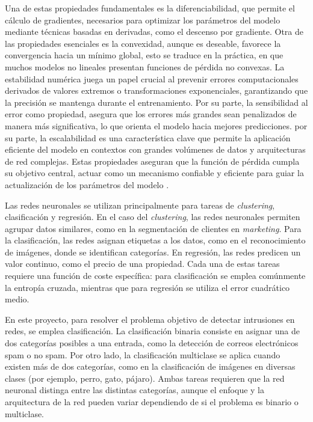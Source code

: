 Una de estas propiedades fundamentales es la diferenciabilidad, que permite el cálculo de gradientes, necesarios para optimizar los parámetros del modelo mediante técnicas basadas en derivadas, como el descenso por gradiente. Otra de las propiedades esenciales es la convexidad, aunque es deseable, favorece la convergencia hacia un mínimo global, esto se traduce en la práctica, en que muchos modelos no lineales presentan funciones de pérdida no convexas. La estabilidad numérica juega un papel crucial al prevenir errores computacionales derivados de valores extremos o transformaciones exponenciales, garantizando que la precisión se mantenga durante el entrenamiento. Por su parte, la sensibilidad al error como propiedad, asegura que los errores más grandes sean penalizados de manera más significativa, lo que orienta el modelo hacia mejores predicciones. por su parte, la escalabilidad es una característica clave que permite la aplicación eficiente del modelo en contextos con grandes volúmenes de datos y arquitecturas de red complejas. Estas propiedades aseguran que la función de pérdida cumpla su objetivo central, actuar como un mecanismo confiable y eficiente para guiar la actualización de los parámetros del modelo \cite{ultralytics_loss_function}.

Las redes neuronales se utilizan principalmente para tareas de \textit{clustering}, clasificación y regresión. En el caso del \textit{clustering}, las redes neuronales permiten agrupar datos similares, como en la segmentación de clientes en \textit{marketing}. Para la clasificación, las redes asignan etiquetas a los datos, como en el reconocimiento de imágenes, donde se identifican categorías. En regresión, las redes predicen un valor continuo, como el precio de una propiedad. Cada una de estas tareas requiere una función de coste específica: para clasificación se emplea comúnmente la entropía cruzada, mientras que para regresión se utiliza el error cuadrático medio.

En este proyecto, para resolver el problema objetivo de detectar intrusiones en redes, se emplea clasificación. La clasificación binaria consiste en asignar una de dos categorías posibles a una entrada, como la detección de correos electrónicos spam o no spam. Por otro lado, la clasificación multiclase se aplica cuando existen más de dos categorías, como en la clasificación de imágenes en diversas clases (por ejemplo, perro, gato, pájaro). Ambas tareas requieren que la red neuronal distinga entre las distintas categorías, aunque el enfoque y la arquitectura de la red pueden variar dependiendo de si el problema es binario o multiclase.

